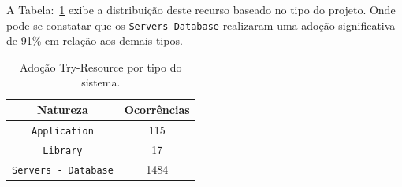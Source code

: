 A Tabela:~\ref{tab:adocaoResource} exibe a distribuição deste recurso baseado no tipo do projeto. Onde pode-se constatar que os \texttt{Servers-Database} realizaram uma adoção significativa de \num{91}\% em relação aos demais tipos.
\begin{table}[h]
	\centering
	\caption{Adoção Try-Resource por tipo do sistema.}
	\begin{tabular}{cc}
		\hline
		Natureza & Ocorrências \\ 
		\hline \hline
		\texttt{Application} & 115 \\ 
		\texttt{Library} & 17 \\ 
		\texttt{Servers - Database} & 1484 \\ \hline
	\end{tabular}
	\label{tab:adocaoResource} %
\end{table}


